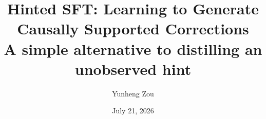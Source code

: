 \title{\textbf{Hinted SFT: Learning to Generate\\Causally Supported Corrections}\\
\large A simple alternative to distilling an unobserved hint}
\author{Yunheng Zou}
\date{July 21, 2026}
